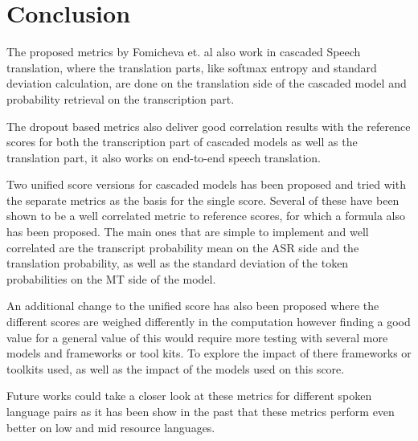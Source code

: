 
\chapter{Conclusion}
\label{ch:Conclusion}
The proposed metrics by Fomicheva et. al \cite{fomicheva2020unsupervised} also work in cascaded Speech translation, where the translation parts, like softmax entropy and standard deviation calculation, are done on the translation side of the cascaded model and probability retrieval on the transcription part. 

The dropout based metrics also deliver good correlation results with the reference scores  for both the transcription part of cascaded models as well as the translation part, it also works on end-to-end speech translation.

Two unified score versions for cascaded models has been proposed and tried with the separate metrics as the basis for the single score. Several of these have been shown to be a well correlated metric to reference scores, for which a formula also has been proposed. The main ones that are simple to implement and well correlated are the transcript probability mean on the ASR side and the translation probability, as well as the standard deviation of the token probabilities on the MT side of the model.

An additional change to the unified score has also been proposed where the different scores are weighed differently in the computation however finding a good value for a general value of this would require more testing with several more models and frameworks or tool kits. To explore the impact of there frameworks or toolkits used, as well as the impact of the models used on this score. 

Future works could take a closer look at these metrics for different spoken language pairs as it has been show in the past that these metrics perform even better on low and mid resource languages. 